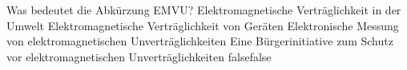     {Was bedeutet die Abkürzung EMVU?}
    {Elektromagnetische Verträglichkeit in der Umwelt}
    {Elektromagnetische Verträglichkeit von Geräten}
    {Elektronische Messung von elektromagnetischen Unverträglichkeiten}
    {Eine Bürgerinitiative zum Schutz vor elektromagnetischen Unverträglichkeiten}
    {false}{false}